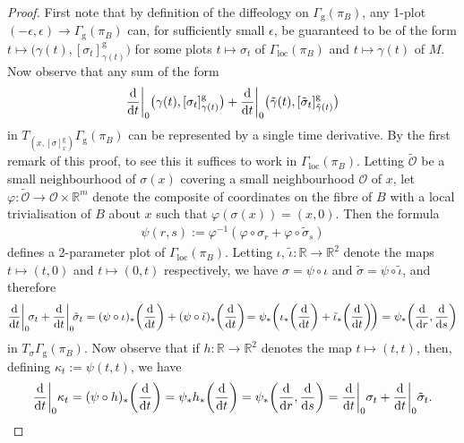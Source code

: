 \documentclass[10pt,a4paper]{amsart}
\numberwithin{equation}{section}
\def\loc{\operatorname{loc}}
\def\g{\operatorname{g}}
\def\OO{{\mathcal{O}}}
\def\RB{{\mathbb{R}}}
\begin{document}
\begin{proof}
First note that by definition of the diffeology on $\Gamma_{\g}(\pi_{B})$, any 1-plot $(-\epsilon,\epsilon)\rightarrow\Gamma_{\g}(\pi_{B})$ can, for sufficiently small $\epsilon$, be guaranteed to be of the form $t\mapsto \big(\gamma(t),[\sigma_{t}]^{\g}_{\gamma(t)}\big)$ for some plots $t\mapsto\sigma_{t}$ of $\Gamma_{\loc}(\pi_{B})$ and $t\mapsto\gamma(t)$ of $M$. Now observe that any sum of the form
\begin{gather*}
\frac{\rm d}{{\rm d}t}\bigg|_{0}\big(\gamma(t),[\sigma_{t}]^{\g}_{\gamma(t)}\big) +\frac{\rm d}{{\rm d}t}\bigg|_{0}\big(\tilde{\gamma}(t),[\tilde{\sigma}_{t}]^{\g}_{\tilde{\gamma}(t)}\big)
\end{gather*}
in $T_{\left(x,[\sigma]^{\g}_{x}\right)}\Gamma_{\g}(\pi_{B})$ can be represented by a single time derivative. By the first remark of this proof, to see this it suffices to work in $\Gamma_{\loc}(\pi_{B})$. Letting $\tilde{\OO}$ be a small neighbourhood of $\sigma(x)$ covering a small neighbourhood $\OO$ of $x$, let $\varphi\colon \tilde{\OO}\rightarrow\OO\times\RB^{m}$ denote the composite of coordinates on the fibre of $B$ with a local trivialisation of $B$ about $x$ such that $\varphi(\sigma(x)) = (x,0)$. Then the formula
\begin{gather*}%
\psi(r,s):=\varphi^{-1}(\varphi\circ\sigma_{r}+\varphi\circ\tilde{\sigma}_{s})
\end{gather*}
defines a 2-parameter plot of $\Gamma_{\loc}(\pi_{B})$. Letting $\iota,\,\tilde{\iota}\colon \RB\rightarrow\RB^{2}$ denote the maps $t\mapsto(t,0)$ and $t\mapsto(0,t)$ respectively, we have $\sigma = \psi\circ\iota$ and $\tilde{\sigma} =\psi\circ\tilde{\iota}$, and therefore
\begin{gather*}
\frac{\rm d}{{\rm d}t}\bigg|_{0}\!\sigma_{t}+\frac{\rm d}{{\rm d}t}\bigg|_{0}\!\tilde{\sigma}_{t} =(\psi\circ\iota)_{*}\bigg(\frac{\rm d}{{\rm d}t}\bigg)+(\psi\circ\tilde{\iota})_{*}\bigg(\frac{\rm d}{{\rm d}t}\bigg)\! = \psi_{*}\bigg(\iota_{*}\bigg(\frac{\rm d}{{\rm d}t}\bigg)+\tilde{\iota}_{*}\bigg(\frac{\rm d}{{\rm d}t}\bigg)\!\bigg) = \psi_{*}\bigg(\frac{\rm d}{{\rm d}r},\frac{\rm d}{{\rm d}s}\bigg)
\end{gather*}
in $T_{\sigma}\Gamma_{\g}(\pi_{B})$. Now observe that if $h\colon \RB\rightarrow\RB^{2}$ denotes the map $t\mapsto(t,t)$, then, defining $\kappa_{t}:=\psi(t,t)$, we have
\begin{gather*}
\frac{\rm d}{{\rm d}t}\bigg|_{0}\kappa_{t} = (\psi\circ h)_{*}\bigg(\frac{\rm d}{{\rm d}t}\bigg) = \psi_{*}h_{*}\bigg(\frac{\rm d}{{\rm d}t}\bigg) = \psi_{*}\bigg(\frac{\rm d}{{\rm d}r},\frac{\rm d}{{\rm d}s}\bigg) = \frac{\rm d}{{\rm d}t}\bigg|_{0}\sigma_{t}+\frac{\rm d}{{\rm d}t}\bigg|_{0}\tilde{\sigma}_{t}.

\end{gather*}
\end{proof}
\end{document}
